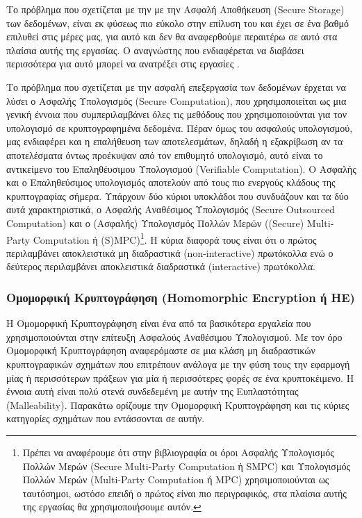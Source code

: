 Το πρόβλημα που σχετίζεται με την με την Ασφαλή Αποθήκευση (Secure Storage) των δεδομένων, είναι εκ φύσεως πιο εύκολο στην επίλυση του και έχει σε ένα βαθμό επιλυθεί στις μέρες μας, για αυτό και δεν θα αναφερθούμε περαιτέρω σε αυτό στα πλαίσια αυτής της εργασίας. Ο αναγνώστης που ενδιαφέρεται να διαβάσει περισσότερα για αυτό μπορεί να ανατρέξει στις εργασίες \cite{10.1145/1315245.1315318} \cite{DBLP:journals/access/Gupta0LB22}. 

Το πρόβλημα που σχετίζεται με την ασφαλή επεξεργασία των δεδομένων έρχεται να λύσει ο Ασφαλής Υπολογισμός (Secure Computation), που χρησιμοποιείται ως μια γενική έννοια που συμπεριλαμβάνει όλες τις μεθόδους που χρησιμοποιούνται για τον υπολογισμό σε κρυπτογραφημένα δεδομένα. Πέραν όμως του ασφαλούς υπολογισμού, μας ενδιαφέρει και η επαλήθευση των αποτελεσμάτων, δηλαδή η εξακρίβωση αν τα αποτελέσματα όντως προέκυψαν από τον επιθυμητό υπολογισμό, αυτό είναι το αντικείμενο του Επαληθέυσιμου Υπολογισμού (Verifiable Computation). Ο Ασφαλής και ο Επαληθεύσιμος υπολογισμός αποτελούν από τους πιο ενεργούς κλάδους της κρυπτογραφίας σήμερα. Υπάρχουν δύο κύριοι υποκλάδοι που συνδυάζουν και τα δύο αυτά χαρακτηριστικά, ο Ασφαλής Αναθέσιμος Υπολογισμός (Secure Outsourced Computation) και ο (Ασφαλής) Υπολογισμός Πολλών Μερών ((Secure) Multi-Party Computation ή (S)MPC)\footnote{Πρέπει να αναφέρουμε ότι στην βιβλιογραφία οι όροι Ασφαλής Υπολογισμός Πολλών Μερών (Secure Multi-Party Computation ή  SMPC) και Υπολογισμός Πολλών Μερών (Multi-Party Computation ή MPC)  χρησιμοποιούνται ως ταυτόσημοι, ωστόσο επειδή ο πρώτος είναι πιο περιγραφικός, στα πλαίσια αυτής της εργασίας θα χρησιμοποιήσουμε αυτόν.}. Η κύρια διαφορά τους είναι ότι ο πρώτος περιλαμβάνει αποκλειστικά μη διαδραστικά (non-interactive) πρωτόκολλα ενώ ο δεύτερος περιλαμβάνει αποκλειστικά διαδραστικά (interactive) πρωτόκολλα.

\subsubsection{Ομομορφική Κρυπτογράφηση (Homomorphic Encryption ή HE)}
Η Ομομορφική Κρυπτογράφηση είναι ένα από τα βασικότερα εργαλεία που χρησιμοποιούνται στην επίτευξη Ασφαλούς Αναθέσιμου Υπολογισμού. Με τον όρο Ομομορφική Κρυπτογράφηση αναφερόμαστε σε μια κλάση μη διαδραστικών κρυπτογραφικών σχημάτων που επιτρέπουν ανάλογα με την φύση τους την εφαρμογή μίας ή περισσότερων πράξεων για μία ή περισσότερες φορές σε ένα κρυπτοκέιμενο. Η έννοια αυτή είναι πολύ στενά συνδεδεμένη με αυτήν της Ευπλαστότητας (Malleability). Παρακάτω ορίζουμε την Ομομορφική Κρυπτογράφηση και τις κύριες κατηγορίες σχημάτων που εντάσσονται σε αυτήν.

